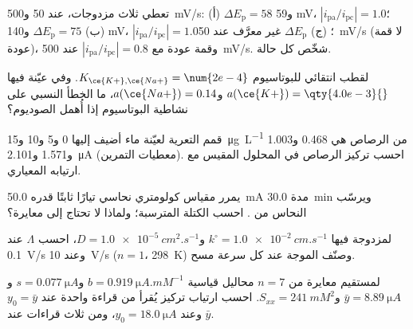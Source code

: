 \begin{exercise}[$\star\star$]\label{exo:b3:electrode-kinetics:7}
تعطي ثلاث مزدوجات، عند 50 و\qty{500}{mV/s}: (أ) $\Delta E_{\mathrm p} = 58$ و59 mV، $|i_{\mathrm{pa}}/i_{\mathrm{pc}}| = 1.0$؛
(ب) $\Delta E_{\mathrm p} = 75$ و140 mV، $|i_{\mathrm{pa}}/i_{\mathrm{pc}}| = 1.0$؛ (ج) $\Delta E_{\mathrm p}$ غير معرَّف عند \qty{50}{mV/s} (لا
قمة عودة)، وقمة عودة مع $|i_{\mathrm{pa}}/i_{\mathrm{pc}}| = 0.8$ عند \qty{500}{mV/s}. شخّص كل حالة.
\end{exercise}

\begin{exercise}[$\star\star$]\label{exo:b3:electrode-kinetics:8}
لقطب انتقائي للبوتاسيوم $K_{\ce{K+},\ce{Na+}} = \num{2e-4}$. وفي عيّنة فيها $a(\ce{K+}) =
\qty{4.0e-3}{}$ و$a(\ce{Na+}) = 0.14$، ما الخطأ النسبي على نشاطية البوتاسيوم إذا
أُهمل الصوديوم؟
\end{exercise}

\begin{exercise}[$\star\star$]\label{exo:b3:electrode-kinetics:9}
قمم التعرية لعيّنة ماء أضيف إليها 0 و5 و10 و\qty{15}{\micro g.L^{-1}} من
الرصاص هي 0.468 و1.003 و1.571 و\qty{2.101}{\micro A} (معطيات التمرين). احسب
تركيز الرصاص في المحلول المقيس مع ارتيابه المعياري.
\end{exercise}

\begin{exercise}[$\star\star\star$]\label{exo:b3:electrode-kinetics:10}
يمرر مقياس كولومتري نحاسي تيارًا ثابتًا قدره \qty{50.0}{mA} مدة \qty{30.0}{min} ويرسّب النحاس
من . احسب الكتلة المترسبة؛ ولماذا لا تحتاج  إلى
معايرة؟
\end{exercise}

\begin{exercise}[$\star\star\star$]\label{exo:b3:electrode-kinetics:11}
لمزدوجة فيها $k^\circ = \qty{1.0e-2}{cm.s^{-1}}$ و$D = \qty{1.0e-5}{cm^2.s^{-1}}$، احسب $\Lambda$ عند \qty{0.1}{V/s}
وعند \qty{10}{V/s} ($n = 1$، \qty{298}{K}) وصنّف الموجة عند كل سرعة مسح.
\end{exercise}

\begin{exercise}[$\star\star\star$]\label{exo:b3:electrode-kinetics:12}
لمستقيم معايرة من $n = 7$ محاليل قياسية $b = \qty{0.919}{\micro A.mM^{-1}}$ و$s = \qty{0.077}{\micro A}$
و$\bar y = \qty{8.89}{\micro A}$ و$S_{xx} = \qty{241}{mM^2}$. احسب ارتياب تركيز يُقرأ
من قراءة واحدة عند $y_0 = \bar y$ وعند $y_0 = \qty{18.0}{\micro A}$، ومن ثلاث قراءات عند $\bar y$.
\end{exercise}

